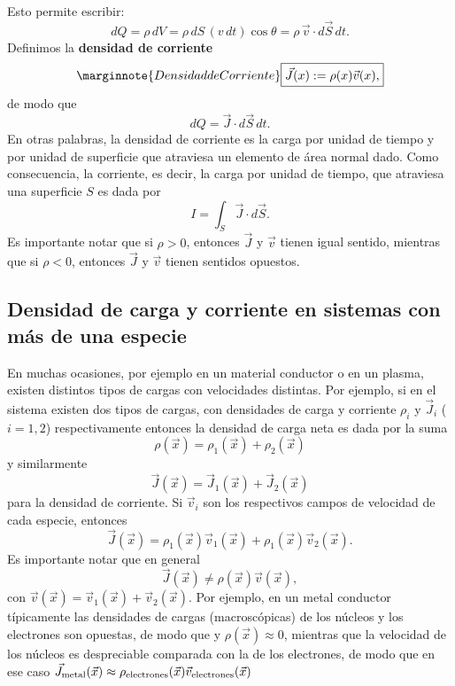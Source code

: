 Esto permite escribir:
\begin{equation}
dQ=\rho\, dV=\rho\, dS\,(v\,dt)\cos\theta=\rho\,\vec{v}\cdot d\vec{S}\,dt.
\end{equation}
Definimos la \textbf{densidad de corriente}
\begin{equation}\marginnote{Densidad de Corriente}
\boxed{\vec{J}(x):=\rho(x)\vec{v}(x),}
\end{equation}
de modo que
\begin{equation}
 dQ=\vec{J}\cdot d\vec{S}\,dt .
\end{equation}
En otras palabras, la densidad de corriente es la carga por unidad de tiempo y
por unidad de superficie que atraviesa un elemento de área normal dado.
Como consecuencia, la corriente, es decir, la carga por unidad de tiempo,
que atraviesa una superficie $S$ es dada por
\begin{equation}
I=\int_{S}\vec{J}\cdot d\vec{S}.
\end{equation}
Es importante notar que si $\rho>0$, entonces $\vec{J}$ y $\vec{v}$ tienen igual
sentido, mientras que si $\rho<0$, entonces $\vec{J}$ y $\vec{v}$ tienen
sentidos opuestos.

\subsection{Densidad de carga y corriente en sistemas con más de una especie}

En muchas ocasiones, por ejemplo en un material conductor o en un plasma, existen distintos tipos de cargas con velocidades distintas. Por ejemplo, si en el sistema existen dos tipos de cargas, con densidades de carga y corriente $\rho_i$ y $\vec{J}_i$ ($i=1,2$) respectivamente entonces la densidad de carga neta es dada por la suma
\begin{equation}
\rho(\vec{x}) = \rho_1(\vec{x}) + \rho_2(\vec{x})
\end{equation}
y similarmente
\begin{equation}
\vec{J}(\vec{x}) = \vec{J}_1(\vec{x}) + \vec{J}_2(\vec{x}) 
\end{equation}
para la densidad de corriente. Si $\vec{v}_i$ son los respectivos campos de velocidad de cada especie, entonces
\begin{equation}
\vec{J}(\vec{x}) = \rho_1(\vec{x})\vec{v}_1(\vec{x}) + \rho_1(\vec{x})\vec{v}_2(\vec{x}) .
\end{equation}
Es importante notar que en general 
\begin{equation}
\vec{J}(\vec{x}) \neq  \rho(\vec{x})\vec{v}(\vec{x}),
\end{equation}
con $\vec{v}(\vec{x})=\vec{v}_1(\vec{x})+\vec{v}_2(\vec{x})$. Por ejemplo, en un metal conductor típicamente las densidades de cargas (macroscópicas) de los núcleos y los electrones son opuestas, de modo que y $\rho(\vec{x})\approx 0$, mientras que la velocidad de los núcleos es despreciable comparada con la de los electrones, de modo que en ese caso $\vec{J}_{\rm metal}(\vec{x})\approx  \rho_{\rm electrones}(\vec{x})\vec{v}_{\rm electrones}(\vec{x})$
